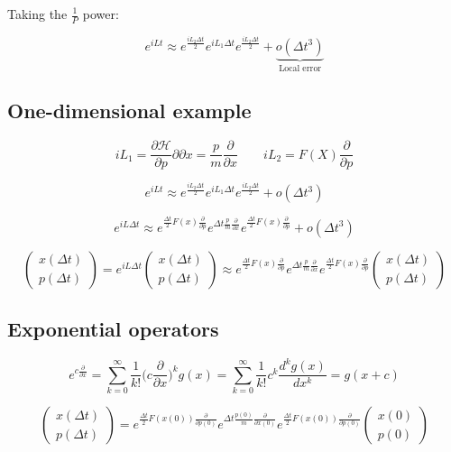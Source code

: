 	Taking the $\frac{1}{P}$ power:

	$$e^{iLt}\approx e^{\frac{iL_2\Delta t}{2}}e^{iL_1\Delta t}e^{\frac{iL_2\Delta t}{2}} + \underbrace{o(\Delta t^3)}_{\text{Local error}}$$

	\subsection{One-dimensional example}

	$$iL_1 = \frac{\partial\mathcal{H}}{\partial p}{\partial }{\partial x} = \frac{p}{m}\frac{\partial }{\partial x}\qquad iL_2 = F(X)\frac{\partial}{\partial p}$$

	$$e^{iLt}\approx e^{\frac{iL_2\Delta t}{2}}e^{iL_1\Delta t}e^{\frac{iL_2\Delta t}{2}} + o(\Delta t^3)$$

	$$e^{iL\Delta t}\approx e^{\frac{\Delta t}{2}F(x)\frac{\partial}{\partial p}}e^{\Delta t\frac{p}{m}\frac{\partial}{\partial x}}e^{\frac{\Delta t}{2}F(x)\frac{\partial}{\partial p}} + o(\Delta t^3)$$

	$$\begin{pmatrix}x(\Delta t)\\ p(\Delta t)\end{pmatrix}=e^{iL\Delta t}\begin{pmatrix}x(\Delta t)\\ p(\Delta t)\end{pmatrix}\approx e^{\frac{\Delta t}{2}F(x)\frac{\partial}{\partial p}}e^{\Delta t\frac{p}{m}\frac{\partial}{\partial x}}e^{\frac{\Delta t}{2}F(x)\frac{\partial}{\partial p}}\begin{pmatrix}x(\Delta t)\\ p(\Delta t)\end{pmatrix}$$

	\subsection{Exponential operators}

	$$e^{c\frac{\partial}{\partial x}} = \sum\limits_{k=0}^\infty\frac{1}{k!}\biggl(c\frac{\partial}{\partial x}\biggr)^kg(x) = \sum\limits_{k=0}^\infty\frac{1}{k!}c^k\frac{d^kg(x)}{dx^k} = g(x+c)$$

	$$\begin{pmatrix}x(\Delta t)\\p(\Delta t)\end{pmatrix} = e^{\frac{\Delta t}{2}F(x(0))\frac{\partial}{\partial p(0)}}e^{\Delta t\frac{p(0)}{m}\frac{\partial}{\partial x(0)}}e^{\frac{\Delta t}{2}F(x(0))\frac{\partial}{\partial p(0)}}\begin{pmatrix}x(0)\\p(0)\end{pmatrix}$$

